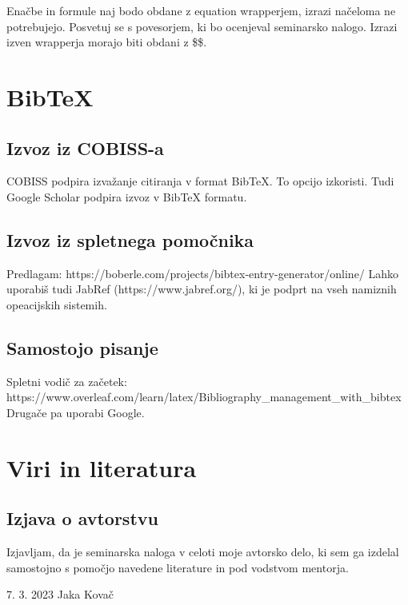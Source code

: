 \documentclass[12pt]{article}
\begin{document}
    Enačbe in formule naj bodo obdane z equation wrapperjem, izrazi načeloma ne potrebujejo.
    Posvetuj se s povesorjem, ki bo ocenjeval seminarsko nalogo. Izrazi izven wrapperja morajo biti obdani z \$\$.


\newpage
\section{BibTeX}
    \subsection{Izvoz iz COBISS-a}
    COBISS podpira izvažanje citiranja v format BibTeX. To opcijo izkoristi.
    Tudi Google Scholar podpira izvoz v BibTeX formatu.
    \subsection{Izvoz iz spletnega pomočnika}
    Predlagam: https://boberle.com/projects/bibtex-entry-generator/online/
    Lahko uporabiš tudi JabRef (https://www.jabref.org/), ki je podprt na vseh namiznih opeacijskih sistemih.
    \subsection{Samostojo pisanje}
    Spletni vodič za začetek: https://www.overleaf.com/learn/latex/Bibliography\_management\_with\_bibtex
    Drugače pa uporabi Google.




\newpage
\begingroup
\makeatletter
    \section{Viri in literatura}
    \nocite{*}
    \printbibliography[heading=none]
\makeatother
\endgroup
\newpage

\begin{samepage}
    \thispagestyle{empty}
    \section*{Izjava o avtorstvu}
    Izjavljam, da je seminarska naloga v celoti moje avtorsko delo, ki sem ga 
    izdelal samostojno s pomočjo navedene literature in pod vodstvom mentorja.

    \vfill
    
    7. 3. 2023 \hfill Jaka Kovač
    
    \vspace{3 cm}
\end{samepage}
\end{document}
